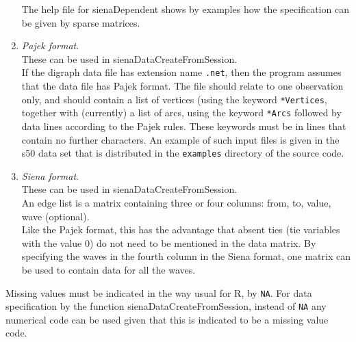 \documentclass[a4paper,fleqn,11pt]{article}
\newcommand{\+}{\, + \,}
\newcommand{\sfn}[1]{\textsf{#1}}
\newcommand{\Rn}{{\sf R}}
\begin{document}
\begin{enumerate}
      The help file for \sfn{sienaDependent} shows by examples how the
      specification can be given by sparse matrices.
    \item \emph{Pajek format}.\\
      These can be used in \sfn{sienaDataCreateFromSession}.\\
      If the digraph data file has extension name \texttt{.net}, then the
      program assumes that the data file has Pajek format.
      The file should relate to one observation only,
      and should contain a list of vertices (using the
      keyword \texttt{*Vertices}, together with (currently) a list of arcs,
      using the keyword \texttt{*Arcs}
      followed by data lines according to the Pajek rules.
      These keywords must be in lines that contain no further characters.
      An example of such input files is given in the s50 data set
      that is distributed in the \texttt{examples} directory of the
      source code.
    \item \emph{Siena format}.\\
      These can be used in \sfn{sienaDataCreateFromSession}.\\
      An edge list is a matrix containing three or four columns:
      from, to, value, wave (optional).\\
      Like the Pajek format, this has the advantage that absent ties (tie
      variables with the value 0) do not need to be mentioned in the data
      matrix. By specifying the waves in the fourth column in the
      \sfn{Siena} format, one matrix can be used to contain data for all
      the waves.

\end{enumerate}

Missing values must be indicated in the way usual for \Rn,
by \texttt{NA}.
For data specification by the function
\textsf{sienaDataCreateFromSession},
instead of \texttt{NA} any numerical code can be used
given that this is indicated to be a missing value code.
\end{document}
